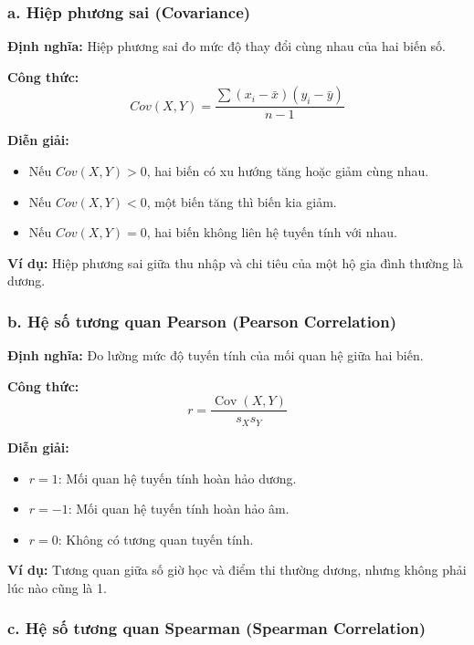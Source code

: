 \subsubsection{a. Hiệp phương sai (Covariance)}
\textbf{Định nghĩa:} Hiệp phương sai đo mức độ thay đổi cùng nhau của hai biến số.

\textbf{Công thức:}
\begin{equation}
Cov(X,Y) = \frac{\sum (x_i - \bar{x}) (y_i - \bar{y})}{n - 1}
\end{equation}

\textbf{Diễn giải:}
\begin{itemize}
    \item Nếu $Cov(X,Y) > 0$, hai biến có xu hướng tăng hoặc giảm cùng nhau.
    \item Nếu $Cov(X,Y) < 0$, một biến tăng thì biến kia giảm.
    \item Nếu $Cov(X,Y) = 0$, hai biến không liên hệ tuyến tính với nhau.
\end{itemize}

\textbf{Ví dụ:} Hiệp phương sai giữa thu nhập và chi tiêu của một hộ gia đình thường là dương.


\subsubsection{b. Hệ số tương quan Pearson (Pearson Correlation)}

\textbf{Định nghĩa:} Đo lường mức độ tuyến tính của mối quan hệ giữa hai biến.

\textbf{Công thức:}
\begin{equation}
    r = \frac{\operatorname{Cov}(X,Y)}{s_X s_Y}
\end{equation}

\textbf{Diễn giải:}
\begin{itemize}
    \item $r=1$: Mối quan hệ tuyến tính hoàn hảo dương.
    \item $r=-1$: Mối quan hệ tuyến tính hoàn hảo âm.
    \item $r=0$: Không có tương quan tuyến tính.
\end{itemize}

\textbf{Ví dụ:} Tương quan giữa số giờ học và điểm thi thường dương, nhưng không phải lúc nào cũng là 1.

\subsubsection{c. Hệ số tương quan Spearman (Spearman Correlation)}
